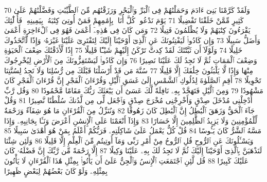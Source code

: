 {\tiny\colorbox{cl_aya}{70}} وَلَقَدْ كَرَّمْنَا بَنِىٓ ءَادَمَ وَحَمَلْنَٰهُمْ فِى ٱلْبَرِّ وَٱلْبَحْرِ وَرَزَقْنَٰهُم مِّنَ ٱلطَّيِّبَٰتِ وَفَضَّلْنَٰهُمْ عَلَىٰ كَثِيرٍ مِّمَّنْ خَلَقْنَا تَفْضِيلًا
{\tiny\colorbox{cl_aya}{71}} يَوْمَ نَدْعُوا۟ كُلَّ أُنَاسٍۭ بِإِمَٰمِهِمْ فَمَنْ أُوتِىَ كِتَٰبَهُۥ بِيَمِينِهِۦ فَأُو۟لَٰٓئِكَ يَقْرَءُونَ كِتَٰبَهُمْ وَلَا يُظْلَمُونَ فَتِيلًا
{\tiny\colorbox{cl_aya}{72}} وَمَن كَانَ فِى هَٰذِهِۦٓ أَعْمَىٰ فَهُوَ فِى ٱلْءَاخِرَةِ أَعْمَىٰ وَأَضَلُّ سَبِيلًا
{\tiny\colorbox{cl_aya}{73}} وَإِن كَادُوا۟ لَيَفْتِنُونَكَ عَنِ ٱلَّذِىٓ أَوْحَيْنَآ إِلَيْكَ لِتَفْتَرِىَ عَلَيْنَا غَيْرَهُۥ وَإِذًا لَّٱتَّخَذُوكَ خَلِيلًا
{\tiny\colorbox{cl_aya}{74}} وَلَوْلَآ أَن ثَبَّتْنَٰكَ لَقَدْ كِدتَّ تَرْكَنُ إِلَيْهِمْ شَيْـًٔا قَلِيلًا
{\tiny\colorbox{cl_aya}{75}} إِذًا لَّأَذَقْنَٰكَ ضِعْفَ ٱلْحَيَوٰةِ وَضِعْفَ ٱلْمَمَاتِ ثُمَّ لَا تَجِدُ لَكَ عَلَيْنَا نَصِيرًا
{\tiny\colorbox{cl_aya}{76}} وَإِن كَادُوا۟ لَيَسْتَفِزُّونَكَ مِنَ ٱلْأَرْضِ لِيُخْرِجُوكَ مِنْهَا وَإِذًا لَّا يَلْبَثُونَ خِلَٰفَكَ إِلَّا قَلِيلًا
{\tiny\colorbox{cl_aya}{77}} سُنَّةَ مَن قَدْ أَرْسَلْنَا قَبْلَكَ مِن رُّسُلِنَا وَلَا تَجِدُ لِسُنَّتِنَا تَحْوِيلًا
{\tiny\colorbox{cl_aya}{78}} أَقِمِ ٱلصَّلَوٰةَ لِدُلُوكِ ٱلشَّمْسِ إِلَىٰ غَسَقِ ٱلَّيْلِ وَقُرْءَانَ ٱلْفَجْرِ إِنَّ قُرْءَانَ ٱلْفَجْرِ كَانَ مَشْهُودًا
{\tiny\colorbox{cl_aya}{79}} وَمِنَ ٱلَّيْلِ فَتَهَجَّدْ بِهِۦ نَافِلَةً لَّكَ عَسَىٰٓ أَن يَبْعَثَكَ رَبُّكَ مَقَامًا مَّحْمُودًا
{\tiny\colorbox{cl_aya}{80}} وَقُل رَّبِّ أَدْخِلْنِى مُدْخَلَ صِدْقٍ وَأَخْرِجْنِى مُخْرَجَ صِدْقٍ وَٱجْعَل لِّى مِن لَّدُنكَ سُلْطَٰنًا نَّصِيرًا
{\tiny\colorbox{cl_aya}{81}} وَقُلْ جَآءَ ٱلْحَقُّ وَزَهَقَ ٱلْبَٰطِلُ إِنَّ ٱلْبَٰطِلَ كَانَ زَهُوقًا
{\tiny\colorbox{cl_aya}{82}} وَنُنَزِّلُ مِنَ ٱلْقُرْءَانِ مَا هُوَ شِفَآءٌ وَرَحْمَةٌ لِّلْمُؤْمِنِينَ وَلَا يَزِيدُ ٱلظَّٰلِمِينَ إِلَّا خَسَارًا
{\tiny\colorbox{cl_aya}{83}} وَإِذَآ أَنْعَمْنَا عَلَى ٱلْإِنسَٰنِ أَعْرَضَ وَنَـَٔا بِجَانِبِهِۦ وَإِذَا مَسَّهُ ٱلشَّرُّ كَانَ يَـُٔوسًا
{\tiny\colorbox{cl_aya}{84}} قُلْ كُلٌّ يَعْمَلُ عَلَىٰ شَاكِلَتِهِۦ فَرَبُّكُمْ أَعْلَمُ بِمَنْ هُوَ أَهْدَىٰ سَبِيلًا
{\tiny\colorbox{cl_aya}{85}} وَيَسْـَٔلُونَكَ عَنِ ٱلرُّوحِ قُلِ ٱلرُّوحُ مِنْ أَمْرِ رَبِّى وَمَآ أُوتِيتُم مِّنَ ٱلْعِلْمِ إِلَّا قَلِيلًا
{\tiny\colorbox{cl_aya}{86}} وَلَئِن شِئْنَا لَنَذْهَبَنَّ بِٱلَّذِىٓ أَوْحَيْنَآ إِلَيْكَ ثُمَّ لَا تَجِدُ لَكَ بِهِۦ عَلَيْنَا وَكِيلًا
{\tiny\colorbox{cl_aya}{87}} إِلَّا رَحْمَةً مِّن رَّبِّكَ إِنَّ فَضْلَهُۥ كَانَ عَلَيْكَ كَبِيرًا
{\tiny\colorbox{cl_aya}{88}} قُل لَّئِنِ ٱجْتَمَعَتِ ٱلْإِنسُ وَٱلْجِنُّ عَلَىٰٓ أَن يَأْتُوا۟ بِمِثْلِ هَٰذَا ٱلْقُرْءَانِ لَا يَأْتُونَ بِمِثْلِهِۦ وَلَوْ كَانَ بَعْضُهُمْ لِبَعْضٍ ظَهِيرًا
